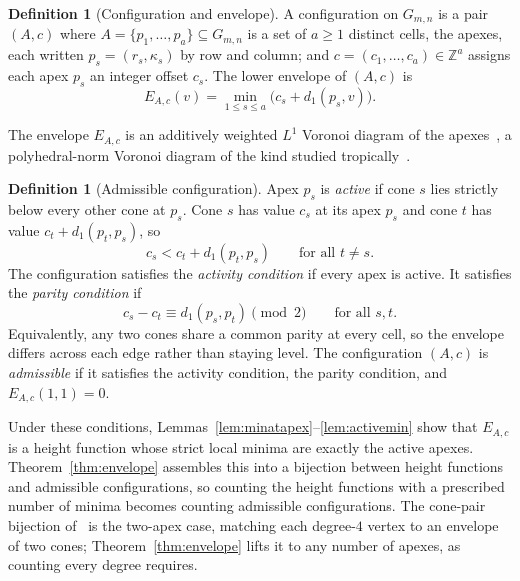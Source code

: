 \documentclass[11pt]{article}
\theoremstyle{definition}
\newtheorem{definition}[theorem]{Definition}
\theoremstyle{remark}
\newcommand{\dgrid}{d_1}
\newcommand{\Z}{\mathbb{Z}}
\newcommand{\Gmn}{G_{m,n}}
\begin{document}
\begin{definition}[Configuration and envelope]\label{def:config}
A configuration on $\Gmn$ is a pair $(A,c)$ where
$A=\{p_1,\dots,p_a\}\subseteq\Gmn$ is a set of $a\ge1$ distinct cells, the
apexes, each written $p_s=(r_s,\kappa_s)$ by row and column; and
$c=(c_1,\dots,c_a)\in\Z^a$ assigns each apex $p_s$ an integer offset $c_s$.
The lower envelope of $(A,c)$ is
\begin{equation}\label{eq:Eac}
  E_{A,c}(v)=\min_{1\le s\le a}\big(c_s+\dgrid(p_s,v)\big).
\end{equation}
\end{definition}

The envelope $E_{A,c}$ is an additively weighted $L^1$ Voronoi diagram of the
apexes~\cite{Aurenhammer1991}, a polyhedral-norm Voronoi diagram of the kind
studied tropically~\cite{CriadoJoswigSantos2021,DevelinSturmfels2004}.

\begin{definition}[Admissible configuration]\label{def:admissible}
Apex $p_s$ is \emph{active} if cone $s$ lies strictly below every other
cone at $p_s$. Cone $s$ has value $c_s$ at its apex $p_s$ and cone $t$ has
value $c_t+\dgrid(p_t,p_s)$, so
\begin{equation}\label{eq:active}
  c_s<c_t+\dgrid(p_t,p_s)\qquad\text{for all }t\ne s.
\end{equation}
The configuration satisfies the \emph{activity condition} if every apex is
active. It satisfies the \emph{parity condition} if
\begin{equation}\label{eq:par}
  c_s-c_t\equiv\dgrid(p_s,p_t)\pmod 2\qquad\text{for all }s,t.
\end{equation}
Equivalently, any two cones share a common parity at every cell, so the envelope
differs across each edge rather than staying level.
The configuration $(A,c)$ is \emph{admissible} if it satisfies the activity
condition, the parity condition, and $E_{A,c}(1,1)=0$.
\end{definition}

Under these conditions, Lemmas~\ref{lem:minatapex}--\ref{lem:activemin}
show that $E_{A,c}$ is a height function whose strict local minima are
exactly the active apexes. Theorem~\ref{thm:envelope} assembles this into a
bijection between height functions and admissible configurations, so
counting the height functions with a prescribed number of minima becomes
counting admissible configurations. The cone-pair bijection
of~\cite{Gupta2026companion} is the two-apex case, matching each
degree-$4$ vertex to an envelope of two cones; Theorem~\ref{thm:envelope}
lifts it to any number of apexes, as counting every degree requires.
\end{document}
